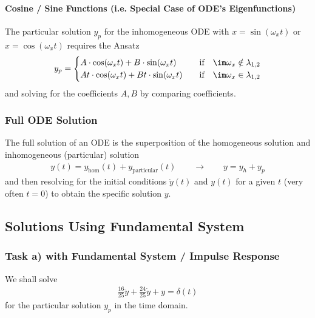 \paragraph{Cosine / Sine Functions (i.e. Special Case of ODE's Eigenfunctions)}
\label{Sec:CosSineAnsatzInhomo}
The particular solution $y_p$ for the inhomogeneous ODE with
$x=\sin(\omega_x t)$ or $x=\cos(\omega_x t)$
requires the Ansatz
\begin{align}
y_p =
\begin{cases}
A \cdot \cos(\omega_x t) + B \cdot \sin(\omega_x t)&\quad \text{if}
\quad \im \omega_x \notin \lambda_{1,2}\\
A t \cdot \cos(\omega_x t) + B t \cdot \sin(\omega_x t)&\quad \text{if}
\quad \im \omega_x \in \lambda_{1,2}
\end{cases}
\end{align}
and solving for the coefficients $A, B$ by comparing coefficients.



\subsubsection{Full ODE Solution}
The full solution of an ODE is the superposition of the homogeneous solution
and inhomogeneous (particular) solution
\begin{align}
y(t) = y_\text{hom}(t)+y_\text{particular}(t) \qquad \rightarrow \qquad
y = y_h + y_p
\end{align}
and then resolving for the initial conditions $\dot{y}(t)$ and $y(t)$ for a
given $t$ (very often $t=0$) to obtain the specific solution $y$.



\subsection{Solutions Using Fundamental System}



\subsubsection{Task a) with Fundamental System / Impulse Response}
We shall solve
\begin{align}
\frac{16}{25} \ddot{y} + \frac{24}{25} \dot{y} + y = \delta(t)
\end{align}
for the particular solution $y_p$ in the time domain.

